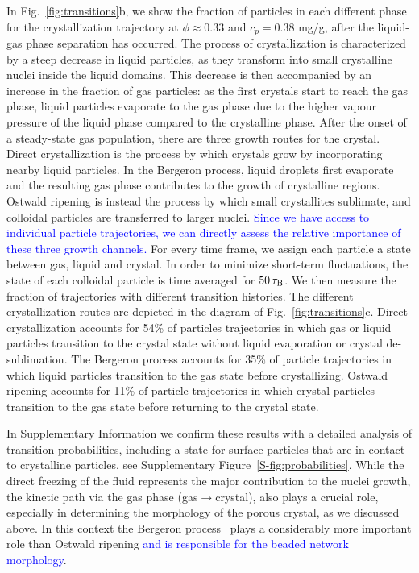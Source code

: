 \documentclass[preprint,amsmath,amssymb,superscriptaddress]{revtex4-1}
\begin{document}
In Fig.~\ref{fig:transitions}b, we show  the fraction of particles in each different phase for the crystallization trajectory at
$\phi\approx 0.33$ and $c_p=0.38$ mg/g, after the liquid-gas phase separation has occurred.
The process of crystallization is characterized 
by a steep decrease in liquid particles, as they transform into small crystalline nuclei inside the liquid domains. This decrease
is then accompanied by an increase in the fraction of gas particles: as the first crystals start to reach the gas phase, liquid particles evaporate 
to the gas phase due to the higher vapour pressure of the liquid phase compared to the crystalline phase. 
After the onset of a steady-state gas population, there are three growth routes for the crystal. 
Direct crystallization is the process by which crystals grow by incorporating nearby liquid particles. 
In the Bergeron process, liquid droplets first evaporate and the resulting gas phase contributes to the growth of crystalline regions. Ostwald ripening is instead the process by which small crystallites sublimate, and colloidal particles are transferred to larger nuclei.
\textcolor{blue}{Since we have access to individual particle trajectories, we can directly assess the relative importance of these three growth channels.}
For every time frame, we assign each particle a state between gas, liquid and crystal. In order to minimize short-term fluctuations, the state of each colloidal particle is time averaged for $50\,\tau_{\rm B}$. We then measure the fraction of trajectories with different transition histories.
The different crystallization routes are depicted in the diagram of Fig.~\ref{fig:transitions}c.
Direct crystallization accounts for 54\% of particles trajectories in which gas or liquid particles transition to the crystal state without liquid evaporation or crystal de-sublimation. 
The Bergeron process accounts for 35\% of particle trajectories in which liquid particles transition to the gas state before crystallizing. 
Ostwald ripening accounts for 11\% of particle trajectories in which crystal particles transition to the gas state before returning to the crystal state. 


In Supplementary Information we confirm these results with a detailed analysis of transition probabilities, including a state for surface particles that are in contact 
to crystalline particles, see Supplementary Figure~\ref{S-fig:probabilities}.
While the direct freezing of the fluid represents the major contribution to the nuclei growth, the kinetic path via the gas phase (gas$\rightarrow$crystal), also plays a crucial role,
especially in determining the morphology of the porous crystal, as we discussed above. In this context the Bergeron process~\cite{glickman2000glossary,morrison2012resilience}
plays a considerably more important role than Ostwald ripening \textcolor{blue}{and is responsible for the beaded network morphology}.
\end{document}
